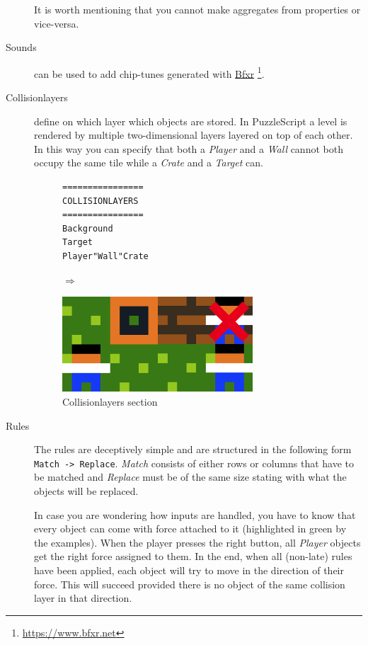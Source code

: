 \begin{description}
        It is worth mentioning that you cannot make aggregates from properties or vice-versa.
    
    
    \item[Sounds] can be used to add chip-tunes generated with \href{https://www.bfxr.net}{Bfxr} \footnote{\url{https://www.bfxr.net}}.
    
    \item[Collisionlayers] define on which layer which objects are stored. In PuzzleScript a level is rendered by multiple two-dimensional layers layered on top of each other.
     In this way you can specify that both a \textit{Player} and a \textit{Wall} cannot both occupy the same tile while a \textit{Crate} and a \textit{Target} can.
     
             \begin{figure}[!htbp]
    \begin{minipage}{0.4\textwidth}
        \centering
    \begin{lstlisting}
================
COLLISIONLAYERS
================
Background
Target
Player"Wall"Crate
    \end{lstlisting}
    
    \end{minipage} \qquad $\Longrightarrow$ \hfill
    \begin{minipage}{0.45\textwidth}
    \includegraphics[width=0.7\textwidth]{figures/collisionlayersboth.png}
    \end{minipage}
    \caption{Collisionlayers section}
    \end{figure}
    
    \item[Rules] The rules are deceptively simple and are structured in the following form \: \lstinline{Match -> Replace}. \textit{Match} consists of either rows or columns that have to be matched and \textit{Replace} must be of the same size stating with what the objects will be replaced.
        
        In case you are wondering how inputs are handled, you have to know that every object can come with force attached to it (highlighted in green by the examples).
        When the player presses the right button, all \textit{Player} objects get the right force assigned to them. In the end, when all (non-late) rules have been applied, each object will try to move in the direction of their force. This will succeed provided there is no object of the same collision layer in that direction.
        

\end{description}
